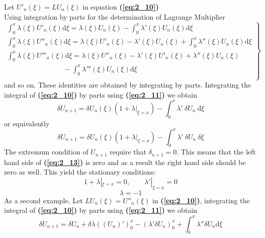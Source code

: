 \documentclass[12pt]{report}
\newcommand{\spn}[1]{\\[#1cm]}
\newcommand{\refn}[1]{\textbf{(\ref{#1})}}
\newcommand{\NI}{\noindent}
\begin{document}
	\NI Let $U'_n(\xi) = LU_n(\xi)$ in equation \refn{eq:2_10}\\
	\newpage
	\NI Using integration by parts for the determination of Lagrange Multiplier\\
	\begin{equation}
		\left.\begin{array}{l}
			\int_{0}^{x}\lambda(\xi) U'_n(\xi) \text{d}\xi = \lambda(\xi)U_n(\xi) - \int_{0}^{x}\lambda'(\xi) U_n(\xi)\text{d}\xi\spn{0.3}
			
			\int_{0}^{x}\lambda(\xi) U''_n(\xi) \text{d}\xi = \lambda(\xi)U'_n(\xi) - \lambda'(\xi)U_n(\xi) + \int_{0}^{x}\lambda''(\xi) U_n(\xi)\text{d}\xi\spn{0.3}
			
			\int_{0}^{x}\lambda(\xi) U'''_n(\xi) \text{d}\xi = \lambda(\xi)U''_n(\xi) - \lambda'(\xi)U'_n(\xi) + \lambda''(\xi)U_n(\xi) \spn{0.1}
			
			 \qquad\qquad\qquad\qquad- \int_{0}^{x}\lambda'''(\xi) U_n(\xi)\text{d}\xi\spn{0.2}
		\end{array}\right\}
		\label{eq:2_11}
	\end{equation}
	and so on. These identities are obtained by integrating by parts. Integrating the integral of \refn{eq:2_10} by parts using \refn{eq:2_11} we obtain
	\begin{equation}
		\delta U_{n+1} = \delta U_n(\xi)(1 + \lambda |_{\xi = x}) - \int_{0}^{x} \lambda' ~\delta U_n ~\text{d}\xi \label{eq:2_12}
	\end{equation}
	or equivalently\\
	\begin{equation}
		\delta U_{n+1} = \delta U_n(\xi)(1+\lambda|_{\xi=x}) - \int_{0}^{x} \lambda' ~ \delta U_n ~\delta \xi \label{eq:2_13}
	\end{equation}
	The extremum condition of $U_{n+1}$ require that $\delta_{n+1} = 0$. This means that the left hand side of \refn{eq:2_13} is zero and as a result the right hand side should be zero as well. This yield the stationary conditions:
	\begin{equation}
		1 + \lambda|_{\xi=x} = 0, \qquad \lambda'|_{\xi=x} = 0 \label{eq:2_14}
	\end{equation}
	\begin{equation}
		\lambda = -1 \label{eq:2_15}
	\end{equation}
	As a second example, Let $LU_n(\xi) = U''_n(\xi)$ in \refn{eq:2_10}, integrating the integral of \refn{eq:2_10} by parts using \refn{eq:2_11} we obtain 
	\begin{equation}
		\delta U_{n+1} = \delta U_n + \delta \lambda\left((U_n)'\right)_0^x - \left(\lambda' \delta U_n\right)_0^x + \int_{0}^{x} \lambda'' \delta U_n \text{d}\xi \label{eq:2_16}
	\end{equation}
\end{document}
